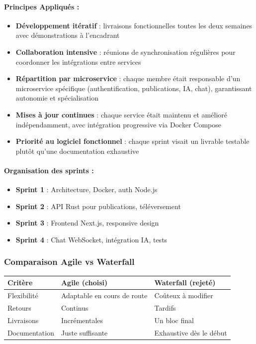\documentclass{rapportPfe}
\begin{document}
\paragraph{Principes Appliqués :}
\begin{itemize}
    \item \textbf{Développement itératif} : livraisons fonctionnelles toutes les deux semaines avec démonstrations à l'encadrant
    \item \textbf{Collaboration intensive} : réunions de synchronisation régulières pour coordonner les intégrations entre services
    \item \textbf{Répartition par microservice} : chaque membre était responsable d’un microservice spécifique (authentification, publications, IA, chat), garantissant autonomie et spécialisation
    \item \textbf{Mises à jour continues} : chaque service était maintenu et amélioré indépendamment, avec intégration progressive via Docker Compose
    \item \textbf{Priorité au logiciel fonctionnel} : chaque sprint visait un livrable testable plutôt qu'une documentation exhaustive
\end{itemize}


\paragraph{Organisation des sprints :}
\begin{itemize}
    \item \textbf{Sprint 1} : Architecture, Docker, auth Node.js
    \item \textbf{Sprint 2} : API Rust pour publications, téléversement
    \item \textbf{Sprint 3} : Frontend Next.js, responsive design
    \item \textbf{Sprint 4} : Chat WebSocket, intégration IA, tests
\end{itemize}

\subsubsection{Comparaison Agile vs Waterfall}
\begin{center}
\begin{tabular}{|l|l|l|}
\hline
\textbf{Critère} & \textbf{Agile (choisi)} & \textbf{Waterfall (rejeté)} \\
\hline
Flexibilité & Adaptable en cours de route & Coûteux à modifier \\
\hline
Retours & Continus & Tardifs \\
\hline
Livraisons & Incrémentales & Un bloc final \\
\hline
Documentation & Juste suffisante & Exhaustive dès le début \\
\hline
\end{tabular}
\end{center}
\end{document}
